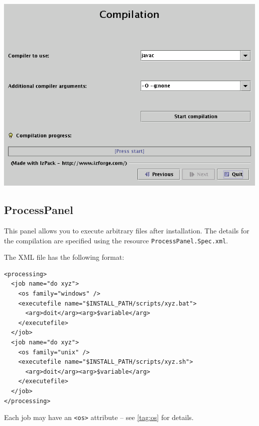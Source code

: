 \includegraphics[width=\linewidth]{img/compilePanel}

\subsection{ProcessPanel}

This panel allows you to execute arbitrary files after installation.
The details for the compilation are specified using the resource \texttt{ProcessPanel.Spec.xml}.

The XML file has the following format:
\begin{verbatim}
<processing>
  <job name="do xyz">
    <os family="windows" />
    <executefile name="$INSTALL_PATH/scripts/xyz.bat">
      <arg>doit</arg><arg>$variable</arg>
    </executefile>
  </job>
  <job name="do xyz">
    <os family="unix" />
    <executefile name="$INSTALL_PATH/scripts/xyz.sh">
      <arg>doit</arg><arg>$variable</arg>
    </executefile>
  </job>
</processing>
\end{verbatim}

Each job may have an \texttt{<os>} attribute -- see \ref{tag:os} for details.
